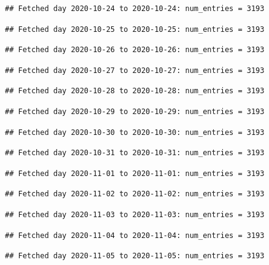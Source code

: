 \documentclass[]{article}
\begin{document}
\begin{verbatim}
## Fetched day 2020-10-24 to 2020-10-24: num_entries = 3193
\end{verbatim}

\begin{verbatim}
## Fetched day 2020-10-25 to 2020-10-25: num_entries = 3193
\end{verbatim}

\begin{verbatim}
## Fetched day 2020-10-26 to 2020-10-26: num_entries = 3193
\end{verbatim}

\begin{verbatim}
## Fetched day 2020-10-27 to 2020-10-27: num_entries = 3193
\end{verbatim}

\begin{verbatim}
## Fetched day 2020-10-28 to 2020-10-28: num_entries = 3193
\end{verbatim}

\begin{verbatim}
## Fetched day 2020-10-29 to 2020-10-29: num_entries = 3193
\end{verbatim}

\begin{verbatim}
## Fetched day 2020-10-30 to 2020-10-30: num_entries = 3193
\end{verbatim}

\begin{verbatim}
## Fetched day 2020-10-31 to 2020-10-31: num_entries = 3193
\end{verbatim}

\begin{verbatim}
## Fetched day 2020-11-01 to 2020-11-01: num_entries = 3193
\end{verbatim}

\begin{verbatim}
## Fetched day 2020-11-02 to 2020-11-02: num_entries = 3193
\end{verbatim}

\begin{verbatim}
## Fetched day 2020-11-03 to 2020-11-03: num_entries = 3193
\end{verbatim}

\begin{verbatim}
## Fetched day 2020-11-04 to 2020-11-04: num_entries = 3193
\end{verbatim}

\begin{verbatim}
## Fetched day 2020-11-05 to 2020-11-05: num_entries = 3193
\end{verbatim}
\end{document}
